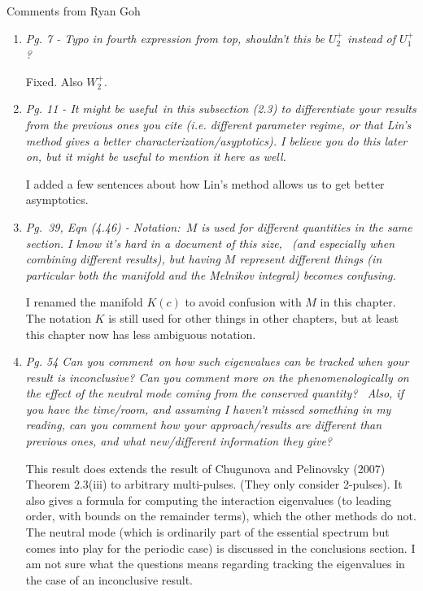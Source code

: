 \documentclass[11pt]{letter}
\begin{document}
Comments from Ryan Goh

\begin{enumerate}
\item \emph{ Pg. 7 - Typo in fourth expression from top, shouldn't this be $U_2^+$ instead of $U_1^+$? }

Fixed. Also $W_2^+$.

\item \emph{Pg. 11 - It might be useful in this subsection (2.3) to differentiate your results from the previous ones you cite (i.e. different parameter regime, or that Lin's method gives a better characterization/asyptotics). I believe you do this later on, but it might be useful to mention it here as well.}

I added a few sentences about how Lin's method allows us to get better asymptotics.

\item \emph{Pg. 39, Eqn (4.46) - Notation: $M$ is used for different quantities in the same section. I know it's hard in a document of this size,  (and especially when combining different results), but having $M$ represent different things (in particular both the manifold and the Melnikov integral) becomes confusing.}

I renamed the manifold $K(c)$ to avoid confusion with $M$ in this chapter. The notation $K$ is still used for other things in other chapters, but at least this chapter now has less ambiguous notation.

\item \emph{Pg. 54 Can you comment on how such eigenvalues can be tracked when your result is inconclusive? Can you comment more on the phenomenologically on the effect of the neutral mode coming from the conserved quantity?  Also, if you have the time/room, and assuming I haven't missed something in my reading, can you comment how your approach/results are different than previous ones, and what new/different information they give?}

This result does extends the result of Chugunova and Pelinovsky (2007) Theorem 2.3(iii) to arbitrary multi-pulses. (They only consider 2-pulses). It also gives a formula for computing the interaction eigenvalues (to leading order, with bounds on the remainder terms), which the other methods do not. The neutral mode (which is ordinarily part of the essential spectrum but comes into play for the periodic case) is discussed in the conclusions section. I am not sure what the questions means regarding tracking the eigenvalues in the case of an inconclusive result.


\end{enumerate}
\end{document}
